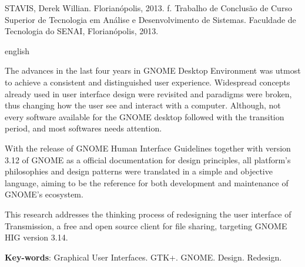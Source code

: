 \noindent STAVIS, Derek Willian. \textbf{\imprimirtitulo} Florianópolis, 2013.
\pageref{nropaginas}f. Trabalho de Conclusão de Curso Superior de Tecnologia em
Análise e Desenvolvimento de Sistemas. Faculdade de Tecnologia do SENAI,
Florianópolis, 2013.

\vspace{1cm}
\begin{resumo}
 \begin{otherlanguage*}{english}
   
  The advances in the last four years in GNOME Desktop Environment was utmost to
  achieve a consistent and distinguished user experience. Widespread concepts
  already used in user interface design were revisited and paradigms were
  broken, thus changing how the user see and interact with a computer. Although,
  not every software available for the GNOME desktop followed with the
  transition period, and most softwares needs attention.
  
  With the release of GNOME Human Interface Guidelines together with version
  3.12 of GNOME as a official documentation for design principles, all
  platform's philosophies and design patterns were translated in a simple and
  objective language, aiming to be the reference for both development and 
  maintenance of GNOME's ecosystem.

  This research addresses the thinking process of redesigning the user interface
  of Transmission, a free and open source client for file sharing, targeting
  GNOME HIG version 3.14.

   \vspace{\onelineskip}
 
   \noindent 
   \textbf{Key-words}: Graphical User Interfaces. GTK+. GNOME. Design. Redesign.
 \end{otherlanguage*}
\end{resumo}

